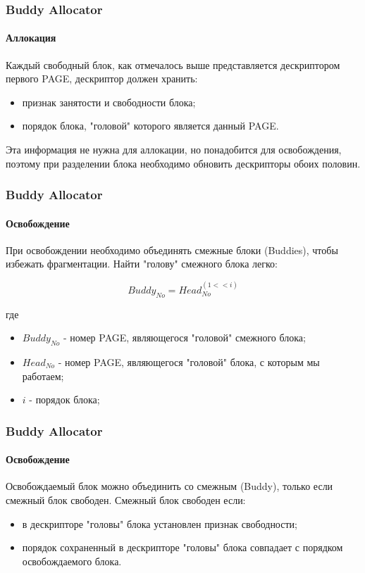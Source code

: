 \begin{frame}
\frametitle{Buddy Allocator}
\framesubtitle{Аллокация}

Каждый свободный блок, как отмечалось выше представляется дескриптором первого PAGE, дескриптор должен хранить:

\begin{itemize}
  \item признак занятости и свободности блока;
  \item порядок блока, "головой" которого является данный PAGE.
\end{itemize}

Эта информация не нужна для аллокации, но понадобится для освобождения, поэтому
при разделении блока необходимо обновить дескрипторы обоих половин.

\end{frame}

\begin{frame}
\frametitle{Buddy Allocator}
\framesubtitle{Освобождение}

При освобождении необходимо объединять смежные блоки (Buddies), чтобы избежать фрагментации. Найти "голову" смежного блока легко:

\[
	Buddy_{No} = Head_{No} ^ (1 << i)
\]

где
\begin{itemize}
  \item $Buddy_{No}$ - номер PAGE, являющегося "головой" смежного блока;
  \item $Head_{No}$ - номер PAGE, являющегося "головой" блока, с которым мы работаем;
  \item $i$ - порядок блока;
\end{itemize}

\end{frame}

\begin{frame}
\frametitle{Buddy Allocator}
\framesubtitle{Освобождение}

Освобождаемый блок можно объединить со смежным (Buddy), только если смежный блок свободен. Смежный блок свободен если:

\begin{itemize}
  \item в дескрипторе "головы" блока установлен признак свободности;
  \item порядок сохраненный в дескрипторе "головы" блока совпадает с порядком освобождаемого блока.
\end{itemize}
\end{frame}

